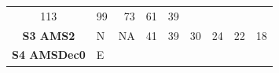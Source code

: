 \documentclass[]{article}
\begin{document}
\begin{longtable}[]{@{}clrrrrrrr@{}}
\begin{minipage}[t]{0.07\columnwidth}
113\strut
\end{minipage} & \begin{minipage}[t]{0.07\columnwidth}\raggedleft\strut
99\strut
\end{minipage} & \begin{minipage}[t]{0.07\columnwidth}\raggedleft\strut
73\strut
\end{minipage} & \begin{minipage}[t]{0.07\columnwidth}\raggedleft\strut
61\strut
\end{minipage} & \begin{minipage}[t]{0.07\columnwidth}\raggedleft\strut
39\strut
\end{minipage}\tabularnewline
\begin{minipage}[t]{0.17\columnwidth}\centering\strut
\textbf{S3 AMS2}\strut
\end{minipage} & \begin{minipage}[t]{0.12\columnwidth}\raggedright\strut
N\strut
\end{minipage} & \begin{minipage}[t]{0.07\columnwidth}\raggedleft\strut
NA\strut
\end{minipage} & \begin{minipage}[t]{0.07\columnwidth}\raggedleft\strut
41\strut
\end{minipage} & \begin{minipage}[t]{0.07\columnwidth}\raggedleft\strut
39\strut
\end{minipage} & \begin{minipage}[t]{0.07\columnwidth}\raggedleft\strut
30\strut
\end{minipage} & \begin{minipage}[t]{0.07\columnwidth}\raggedleft\strut
24\strut
\end{minipage} & \begin{minipage}[t]{0.07\columnwidth}\raggedleft\strut
22\strut
\end{minipage} & \begin{minipage}[t]{0.07\columnwidth}\raggedleft\strut
18\strut
\end{minipage}\tabularnewline
\begin{minipage}[t]{0.17\columnwidth}\centering\strut
\textbf{S4 AMSDec0}\strut
\end{minipage} & \begin{minipage}[t]{0.12\columnwidth}\raggedright\strut
E\strut
\end{minipage} & \begin{minipage}[t]{0.07\columnwidth}\raggedleft\strut

\end{minipage}
\end{longtable}
\end{document}
